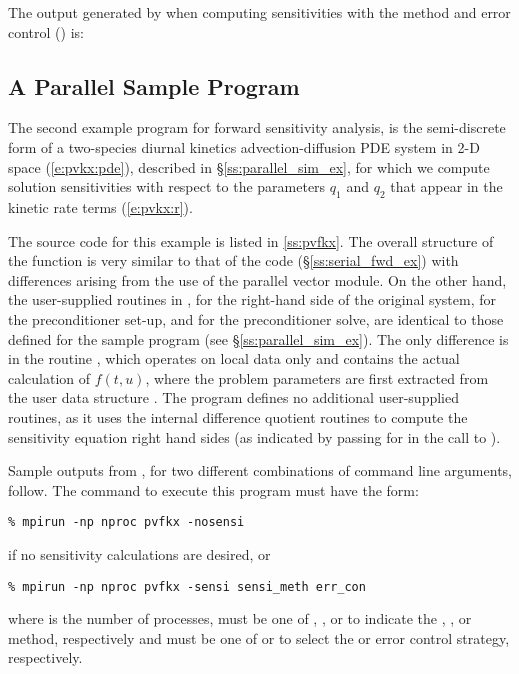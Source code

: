 The output generated by  when computing sensitivities with the 
method and  error control () is:


\subsection{A Parallel Sample Program}\label{ss:parallel_fwd_ex}

The second example program for forward sensitivity analysis,  is the
semi-discrete form of a two-species diurnal kinetics advection-diffusion PDE 
system in 2-D space (\ref{e:pvkx:pde}), described in \S\ref{ss:parallel_sim_ex}, 
for which we compute solution sensitivities with respect to the parameters $q_1$ 
and $q_2$ that appear in the kinetic rate terms (\ref{e:pvkx:r}).

The source code for this example is listed in \A\ref{ss:pvfkx}.
The overall structure of the  function is very
similar to that of the code  (\S\ref{ss:serial_fwd_ex}) with 
differences arising from the use of the parallel vector module.
On the other hand, the user-supplied routines in ,
 for the right-hand side of the original system,
 for the preconditioner set-up, and  for the
preconditioner solve, are identical to those defined for the sample program
 (see \S\ref{ss:parallel_sim_ex}). The only difference is in the
routine , which operates on local data only and contains the actual 
calculation of $f(t,u)$, where the problem parameters are first extracted from
the user data structure . The program  defines no additional
user-supplied routines, as it uses the {\cvodes} internal difference quotient routines 
to compute the sensitivity equation right hand sides (as indicated by passing
 for  in the call to ).

Sample outputs from , for two different combinations of command line arguments, 
follow. The command to execute this program must have the form:
\begin{verbatim}
% mpirun -np nproc pvfkx -nosensi
\end{verbatim} 
if no sensitivity calculations are desired, or
\begin{verbatim}
% mpirun -np nproc pvfkx -sensi sensi_meth err_con
\end{verbatim}
where  is the number of processes,  must be one of , 
, or  to
indicate the , , or  method,
respectively and  must be one of  or  to
select the  or  error control strategy, respectively.

